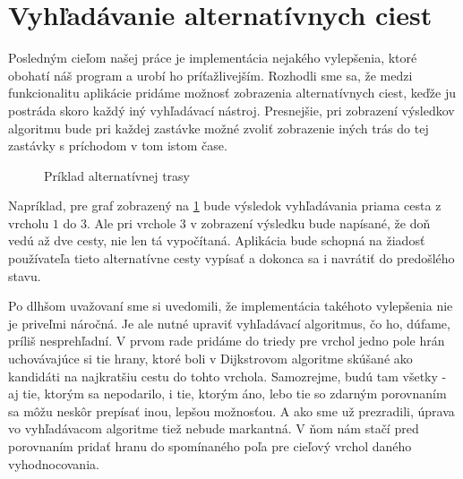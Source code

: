 \section{Vyhľadávanie alternatívnych ciest}

Posledným cieľom našej práce je implementácia nejakého vylepšenia, ktoré obohatí náš program a urobí ho príťažlivejším. Rozhodli sme sa, že medzi funkcionalitu aplikácie pridáme možnosť zobrazenia alternatívnych ciest, keďže ju postráda skoro každý iný vyhľadávací nástroj. Presnejšie, pri zobrazení výsledkov algoritmu bude pri každej zastávke možné zvoliť zobrazenie iných trás do tej zastávky s príchodom v tom istom čase.\newline 

\begin{figure}[H]
  \caption{Príklad alternatívnej trasy}
  \label{alternativ_priklad}
\end{figure}

Napríklad, pre graf zobrazený na \ref{alternativ_priklad} bude výsledok vyhľadávania priama cesta z vrcholu $1$ do $3$. Ale pri vrchole $3$ v zobrazení výsledku bude napísané, že doň vedú až dve cesty, nie len tá vypočítaná. Aplikácia bude schopná na žiadosť používateľa tieto alternatívne cesty vypísať a dokonca sa i navrátiť do predošlého stavu.\newline

Po dlhšom uvažovaní sme si uvedomili, že implementácia takéhoto vylepšenia nie je priveľmi náročná. Je ale nutné upraviť vyhľadávací algoritmus, čo ho, dúfame, príliš nesprehľadní. V prvom rade pridáme do triedy pre vrchol jedno pole hrán uchovávajúce si tie hrany, ktoré boli v Dijkstrovom algoritme skúšané ako kandidáti na najkratšiu cestu do tohto vrchola. Samozrejme, budú tam všetky - aj tie, ktorým sa nepodarilo, i tie, ktorým áno, lebo tie so zdarným porovnaním sa môžu neskôr prepísať inou, lepšou možnosťou. A ako sme už prezradili, úprava vo vyhľadávacom algoritme tiež nebude markantná. V ňom nám stačí pred porovnaním pridať hranu do spomínaného poľa pre cieľový vrchol daného vyhodnocovania.\newline


